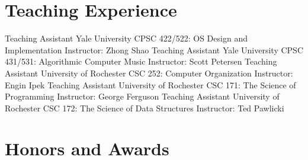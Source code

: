 \documentclass[10pt, letterpaper, sans]{moderncv}
\begin{document}
\section{Teaching Experience}
        {Teaching Assistant}
        {Yale University}
        {CPSC 422/522: OS Design and Implementation}
        {}
        {Instructor: Zhong Shao}
        {Teaching Assistant}
        {Yale University}
        {CPSC 431/531: Algorithmic Computer Music}
        {}
        {Instructor: Scott Petersen}
        {Teaching Assistant}
        {University of Rochester}
        {CSC 252: Computer Organization}
        {}
        {Instructor: Engin Ipek}
        {Teaching Assistant}
        {University of Rochester}
        {CSC 171: The Science of Programming}
        {}
        {Instructor: George Ferguson}
        {Teaching Assistant}
        {University of Rochester}
        {CSC 172: The Science of Data Structures}
        {}
        {Instructor: Ted Pawlicki}


\section{Honors and Awards}


%
\end{document}
